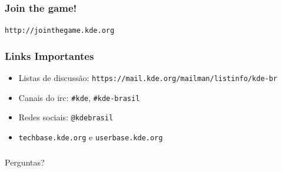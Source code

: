 \documentclass[hyperref={pdfpagelabels=false}]{beamer}
\begin{document}
\begin{frame}
   \frametitle{Join the game!}
   \begin{center}
      \begin{block}{}
         \begin{center}
            {\tt{http://jointhegame.kde.org}}
         \end{center}
      \end{block}
   \end{center}
\end{frame}
\begin{frame}
   \frametitle{Links Importantes}
   \begin{itemize}
      \item Listas de discussão: {\tt{https://mail.kde.org/mailman/listinfo/kde-br}}
      \item Canais do irc: {\tt{\#kde}}, {\tt{\#kde-brasil}}
      \item Redes sociais: {\tt{{@}kdebrasil}}
      \item {\tt{techbase.kde.org}} e {\tt{userbase.kde.org}}
   \end{itemize}
\end{frame}
\begin{frame}
   \frametitle{}
   \begin{center}
      \begin{block}{}
         \begin{center}
            \Huge{Perguntas?}
         \end{center}
      \end{block}
   \end{center}
\end{frame}
\end{document}
